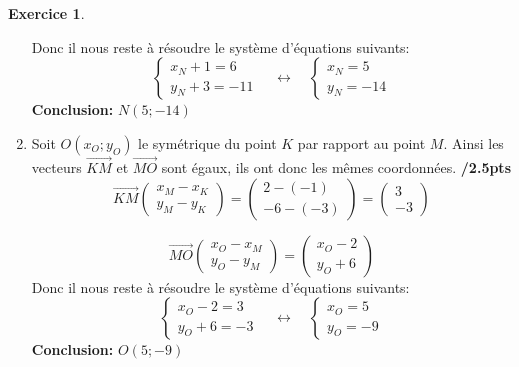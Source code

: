 \documentclass[a4paper,10.9pt]{article}
\theoremstyle{definition}
\newtheorem{exo}{Exercice}
\newcommand{\V}{\overrightarrow}
\begin{document}
\begin{exo}
\begin{enumerate}
Donc il nous reste à résoudre le système d'équations suivants:
$$\left\{\begin{array}{c}
	x_N+1 = 6\\y_N + 3 = -11
\end{array}\right.\quad  \leftrightarrow \quad \left\{\begin{array}{c}
x_N = 5\\y_N  = -14
\end{array}\right.$$
\textbf{Conclusion:} $N(5;-14)$ \\
\item Soit $O(x_O;y_O)$ le symétrique du point $K$ par rapport au point $M$. Ainsi les vecteurs $\V{KM}$ et $\V{MO}$ sont égaux, ils ont donc les mêmes coordonnées.\hfill\textbf{ /2.5pts}\\
$$\V{KM} \begin{pmatrix}
	x_M-x_K\\y_M-y_K
\end{pmatrix} = \begin{pmatrix}
	2-(-1)\\ -6 - (-3)
\end{pmatrix}= \begin{pmatrix}
	3\\-3
\end{pmatrix} $$

$$\V{MO} \begin{pmatrix}
	x_O-x_M\\y_O-y_M
\end{pmatrix} = \begin{pmatrix}
	x_O-2\\y_O+6
\end{pmatrix} $$
Donc il nous reste à résoudre le système d'équations suivants:
$$\left\{\begin{array}{c}
	x_O-2 = 3\\y_O+6 = -3
\end{array}\right.\quad  \leftrightarrow \quad \left\{\begin{array}{c}
	x_O =5 \\y_O = -9
\end{array}\right.$$
\textbf{Conclusion:} $O(5;-9)$ 
\end{enumerate}

\end{exo}
\end{document}
